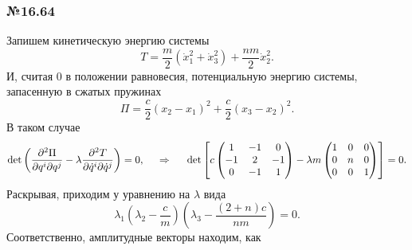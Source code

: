 \subsubsection*{№16.64}
Запишем кинетическую энергию системы
\begin{equation*}
    T = \frac{m}{2} \left(
        \dot{x}_1^2 + \dot{x}_3^2
    \right) + \frac{nm}{2} \dot{x}_2^2.
\end{equation*}
И, считая $0$ в положении равновесия, потенциальную энергию системы, запасенную в сжатых пружинах
\begin{equation*}
    \Pi = \frac{c}{2} (x_2 - x_1)^2 + \frac{c}{2} (x_3 - x_2)^2.
\end{equation*}
В таком случае
\begin{equation*}
     \det \left(
     \frac{\partial^2 \Pi}{\partial q^i \partial q^j} - \lambda \frac{\partial^2 T}{\partial \dot{q}^i \partial \dot{q}^j}\right) = 0,
     \hspace{0.5cm} \Rightarrow \hspace{0.5cm}
     \det\left[
        c \begin{pmatrix}
            1 & -1 & 0 \\
            -1 & 2 & -1 \\
            0 & -1 & 1 \\
        \end{pmatrix} - \lambda 
        m \begin{pmatrix}
            1 & 0 & 0 \\
            0 & n & 0 \\
            0 & 0 & 1 \\
        \end{pmatrix}
     \right] = 0.
\end{equation*}
Раскрывая, приходим у уравнению на $\lambda$ вида
\begin{equation*}
    \lambda_1 \left(
        \lambda_2 - \frac{c}{m}
    \right)\left(
        \lambda_3 - \frac{(2+n)c}{nm}
    \right) = 0.
\end{equation*}
Соответственно, амплитудные векторы находим, как
